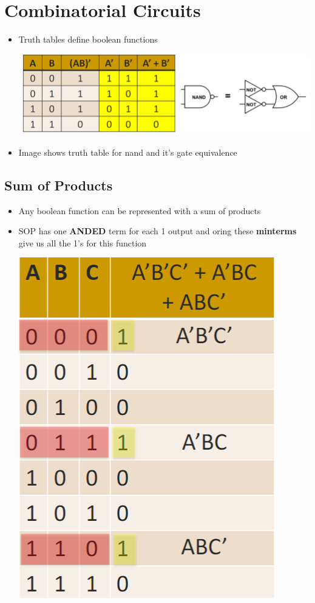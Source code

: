 \documentclass{article}
\begin{document}
\section{Combinatorial Circuits}

\begin{itemize}
    \item Truth tables define boolean functions
    
    \includegraphics[scale=0.35]{images/truthtable.png}
    \item Image shows truth table for nand and it's gate equivalence
    
    
\end{itemize}
\subsection{Sum of Products}

\begin{itemize}
    \item Any boolean function can be represented with a sum of products 
    
    \item SOP has one \textbf{ANDED} term for each 1 output and oring these \textbf{minterms} give us all the 1's for this function
    
    \includegraphics[scale=0.35]{images/minterms.png}
    
\end{itemize}
\end{document}
